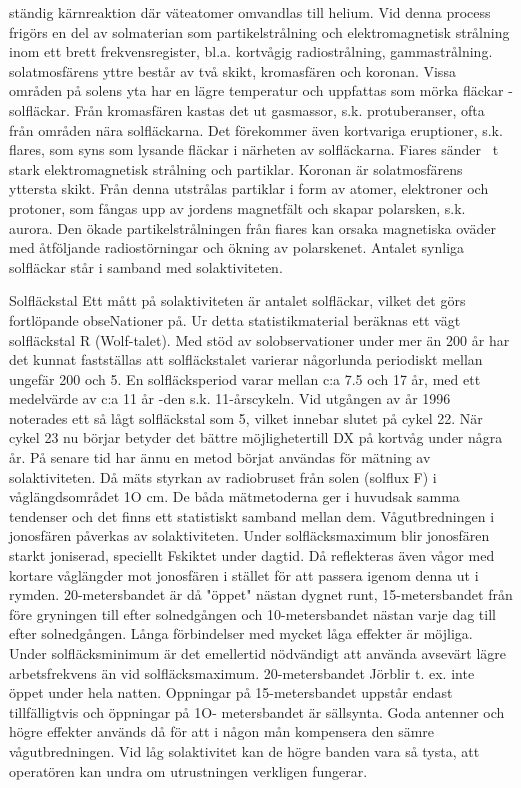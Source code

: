 ständig kärnreaktion där väteatomer omvandlas till helium. Vid denna process frigörs en del av solmaterian som partikelstrålning och elektromagnetisk strålning inom ett
brett frekvensregister, bl.a. kortvågig radiostrålning, gammastrålning. solatmosfärens
yttre består av två skikt, kromasfären och
koronan. Vissa områden på solens yta har
en lägre temperatur och uppfattas som mörka fläckar - solfläckar. Från kromasfären
kastas det ut gasmassor, s.k. protuberanser, ofta från områden nära solfläckarna.
Det förekommer även kortvariga eruptioner, s.k. flares, som syns som lysande fläckar i närheten av solfläckarna. Fiares sänder
~t stark elektromagnetisk strålning och partiklar. Koronan är solatmosfärens yttersta
skikt. Från denna utstrålas partiklar i form av
atomer, elektroner och protoner, som fångas upp av jordens magnetfält och skapar
polarsken, s.k. aurora. Den ökade partikelstrålningen från fiares kan orsaka magnetiska oväder med åtföljande radiostörningar
och ökning av polarskenet. Antalet synliga
solfläckar står i samband med solaktiviteten.

Solfläckstal
Ett mått på solaktiviteten är antalet solfläckar, vilket det görs fortlöpande obseNationer på. Ur detta statistikmaterial beräknas
ett vägt solfläckstal R (Wolf-talet). Med stöd
av solobservationer under mer än 200 år har
det kunnat fastställas att solfläckstalet varierar någorlunda periodiskt mellan ungefär
200 och 5.
En solfläcksperiod varar mellan c:a 7.5
och 17 år, med ett medelvärde av c:a 11 år
-den s.k. 11-årscykeln. Vid utgången av år
1996 noterades ett så lågt solfläckstal som
5, vilket innebar slutet på cykel 22.
När cykel 23 nu börjar betyder det bättre
möjlighetertill DX på kortvåg under några år.
På senare tid har ännu en metod börjat
användas för mätning av solaktiviteten. Då
mäts styrkan av radiobruset från solen (solflux F) i våglängdsområdet 1O cm.
De båda mätmetoderna ger i huvudsak
samma tendenser och det finns ett statistiskt
samband mellan dem.
Vågutbredningen i jonosfären påverkas
av solaktiviteten. Under solfläcksmaximum
blir jonosfären starkt joniserad, speciellt Fskiktet under dagtid. Då reflekteras även
vågor med kortare våglängder mot jonosfären i stället för att passera igenom denna ut
i rymden. 20-metersbandet är då "öppet"
nästan dygnet runt, 15-metersbandet från
före gryningen till efter solnedgången och
10-metersbandet nästan varje dag till efter
solnedgången. Långa förbindelser med
mycket låga effekter är möjliga.
Under solfläcksminimum är det emellertid nödvändigt att använda avsevärt lägre
arbetsfrekvens än vid solfläcksmaximum.
20-metersbandet Jörblir t. ex. inte öppet under hela natten. Oppningar på 15-metersbandet uppstår endast tillfälligtvis och öppningar på 1O- metersbandet är sällsynta.
Goda antenner och högre effekter används
då för att i någon mån kompensera den
sämre vågutbredningen. Vid låg solaktivitet
kan de högre banden vara så tysta, att operatören kan undra om utrustningen verkligen
fungerar.

